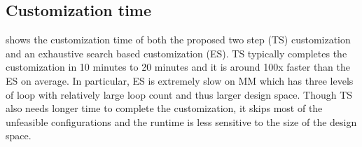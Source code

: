 %
%

%
%
\subsection{Customization time}
 shows the customization time of both the proposed two step (TS) customization
and an exhaustive search based customization (ES). TS typically completes the customization in 10
minutes to 20 minutes and it is around 100x faster than the ES on average. In particular, ES is extremely slow on MM which has three levels of loop with relatively large 
loop count and thus larger design space. Though TS also needs longer time to complete the
customization, it skips most of the unfeasible configurations and the runtime is 
less sensitive to the size of the design space. 


